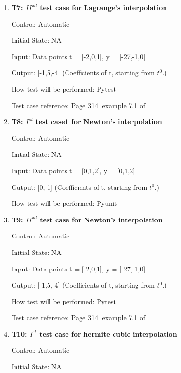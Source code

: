 \documentclass[12pt, titlepage]{article}
\begin{document}
\begin{enumerate}
\item{\textbf{T7: ${II}^{nd}$ test case for Lagrange's interpolation} \\}

Control: Automatic

Initial State: NA

Input: Data points t = [-2,0,1], y = [-27,-1,0]

Output: [-1,5,-4] (Coefficients of t, starting from $t^{0}$.)

How test will be performed: Pytest

Test case reference: Page 314, example 7.1 of  ~\cite{Health1997}\\


\item{\textbf{T8: $I^{st}$ test case1 for Newton's interpolation} \\}

Control: Automatic 

Initial State: NA

Input: Data points t = [0,1,2], y = [0,1,2]

Output: [0, 1] (Coefficients of t, starting from $t^{0}$.)

How test will be performed: Pyunit\\


\item{\textbf{T9: ${II}^{nd}$ test case for Newton's interpolation} \\}

Control: Automatic

Initial State: NA

Input: Data points t = [-2,0,1], y = [-27,-1,0]

Output: [-1,5,-4] (Coefficients of t, starting from $t^{0}$.)

How test will be performed: Pytest

Test case reference: Page 314, example 7.1 of \cite{Health1997}\\




\item{\textbf{T10: $I^{st}$ test case for hermite cubic interpolation }\\}

Control: Automatic 

Initial State: NA


\end{enumerate}
\end{document}
